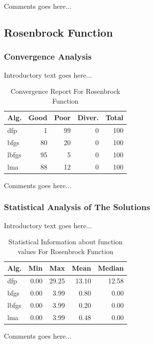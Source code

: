 \documentclass{ieeeaccess}
\begin{document}
Comments goes here...
\subsection{Rosenbrock Function}
\label{rosenbrock30d30D}

\subsubsection{Convergence Analysis}
\label{convergencerosenbrock30d30D}


Introductory text goes here...
\begin{table}
\centering
\caption{Convergence Report For Rosenbrock Function}
\label{convergence:rosenbrock30d}
\begin{tabular}{lrrrr}
\toprule
 Alg. &  Good &  Poor &  Diver. &  Total \\
\midrule
  dfp &     1 &    99 &       0 &    100 \\
 bfgs &    80 &    20 &       0 &    100 \\
lbfgs &    95 &     5 &       0 &    100 \\
  lma &    88 &    12 &       0 &    100 \\
\bottomrule
\end{tabular}
\end{table}


Comments goes here...
\subsubsection{Statistical Analysis of The Solutions}
\label{statisticalanalysisrosenbrock30d30D}


Introductory text goes here...
\begin{table}
\centering
\caption{Statistical Information about function values For Rosenbrock Function}
\label{function_values:rosenbrock30d}
\begin{tabular}{lrrrr}
\toprule
 Alg. &  Min &   Max &  Mean &  Median \\
\midrule
  dfp & 0.00 & 29.25 & 13.10 &   12.58 \\
 bfgs & 0.00 &  3.99 &  0.80 &    0.00 \\
lbfgs & 0.00 &  3.99 &  0.20 &    0.00 \\
  lma & 0.00 &  3.99 &  0.48 &    0.00 \\
\bottomrule
\end{tabular}
\end{table}


Comments goes here...
\end{document}
